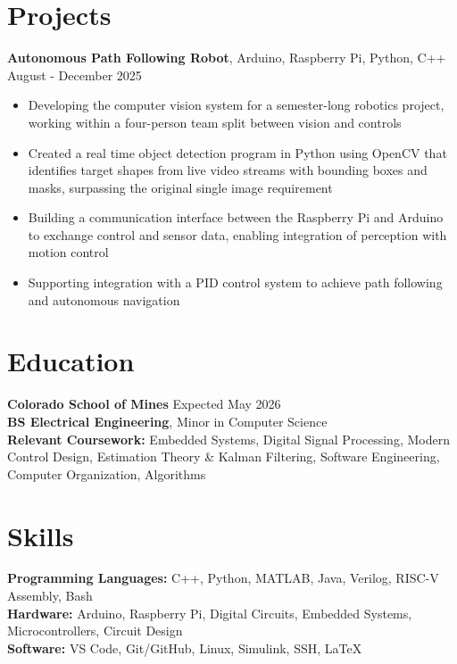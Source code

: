 \documentclass[11pt]{article}
\begin{document}
\section*{Projects}%
%
\textbf{Autonomous Path Following Robot}, Arduino, Raspberry Pi, Python, C++  \hfill August - December 2025
\begin{itemize}
  \item Developing the computer vision system for a semester-long robotics project, working within a four-person team split between vision and controls
  \item Created a real time object detection program in Python using OpenCV that identifies target shapes from live video streams with bounding boxes and masks, surpassing the original single image requirement
  \item Building a communication interface between the Raspberry Pi and Arduino to exchange control and sensor data, enabling integration of perception with motion control
  \item Supporting integration with a PID control system to achieve path following and autonomous navigation
\end{itemize}
\section*{Education}%
%
\textbf{Colorado School of Mines} \hfill Expected May 2026 \\
\textbf{BS Electrical Engineering}, Minor in Computer Science \\
\textbf{Relevant Coursework:} Embedded Systems, Digital Signal Processing, Modern Control Design, Estimation Theory \& Kalman Filtering, Software Engineering, Computer Organization, Algorithms \\
\section*{Skills}%
%
\textbf{Programming Languages:} C++, Python, MATLAB, Java, Verilog, RISC-V Assembly, Bash \\
\textbf{Hardware:} Arduino, Raspberry Pi, Digital Circuits, Embedded Systems, Microcontrollers, Circuit Design \\
\textbf{Software:} VS Code, Git/GitHub, Linux, Simulink, SSH, LaTeX
\end{document}
